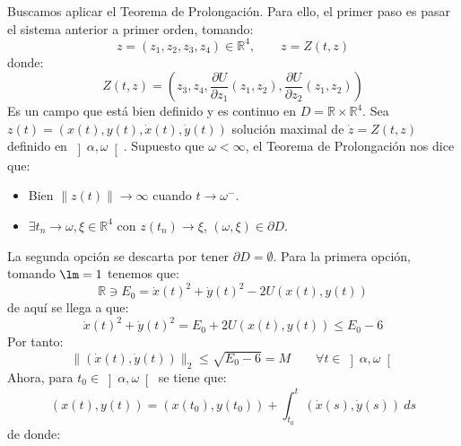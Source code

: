 \begin{ejercicio}
\begin{enumerate}[label=\alph*)]
            Buscamos aplicar el Teorema de Prolongación. Para ello, el primer paso es pasar el sistema anterior a primer orden, tomando:
            \begin{equation*}
                z = (z_1,z_2,z_3,z_4) \in \mathbb{R}^4, \qquad z = Z(t,z)
            \end{equation*}
            donde:
            \begin{equation*}
                Z(t,z) = \left(z_3,z_4,\frac{\partial U}{\partial z_1}(z_1,z_2),\frac{\partial U}{\partial z_2}(z_1,z_2)\right)
            \end{equation*}
            Es un campo que está bien definido y es continuo en $D=\mathbb{R}\times\mathbb{R}^4$. Sea $z(t) = (x(t),y(t),\dot{x}(t),\dot{y}(t))$ solución maximal de $\dot{z} = Z(t,z)$ definido en $\left]\alpha,\omega\right[$. Supuesto que $\omega<\infty$, el Teorema de Prolongación nos dice que:
            \begin{itemize}
                \item Bien $\|z(t)\|\to\infty$ cuando $t\to \omega^-$.
                \item $\exists t_n\to\omega, \xi \in \mathbb{R}^4$ con $z(t_n)\to \xi$, $(\omega,\xi)\in \partial D$.
            \end{itemize}
            La segunda opción se descarta por tener $\partial D =\emptyset $. Para la primera opción, tomando $\lm=1$ tenemos que:
            \begin{equation*}
                \mathbb{R}\ni E_0 = \dot{x}(t)^2 + \dot{y}(t)^2 -2U(x(t),y(t))     
            \end{equation*}
            de aquí se llega a que:
            \begin{equation*}
                \dot{x}(t)^2 + \dot{y}(t)^2 = E_0 + 2U(x(t),y(t)) \leq E_0-6
            \end{equation*}
            Por tanto:
            \begin{equation*}
                \|(\dot{x}(t),\dot{y}(t))\|_2 \leq \sqrt{E_0-6} = M \qquad \forall t\in \left]\alpha,\omega\right[
            \end{equation*}
            Ahora, para $t_0\in \left]\alpha,\omega\right[$ se tiene que:
            \begin{equation*}
                (x(t),y(t)) = (x(t_0),y(t_0)) + \int_{t_0}^{t} (\dot{x}(s), \dot{y}(s))~ds 
            \end{equation*}
            de donde:
            \begin{align*}

\end{align*}
\end{enumerate}
\end{ejercicio}
